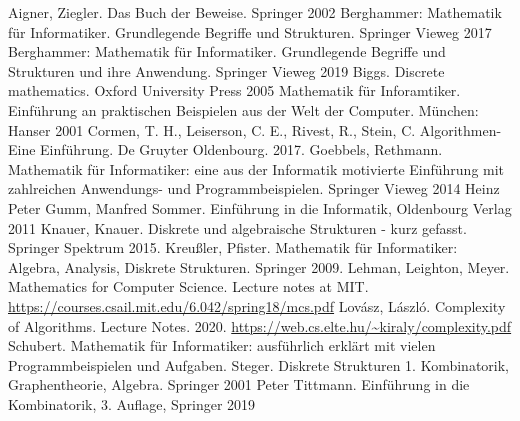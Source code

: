 \begin{thebibliography}{AAAA}
	 Aigner, Ziegler. Das Buch der Beweise. Springer 2002
	 Berghammer: Mathematik für Informatiker. Grundlegende Begriffe und Strukturen. Springer Vieweg 2017
	 Berghammer: Mathematik für Informatiker. Grundlegende Begriffe und Strukturen und ihre Anwendung. Springer Vieweg 2019
	 Biggs. Discrete mathematics. Oxford University Press 2005
	 Mathematik für Inforamtiker. Einführung an praktischen Beispielen aus der Welt der Computer. München: Hanser 2001
	 Cormen, T. H., Leiserson, C. E., Rivest, R., Stein, C.  Algorithmen-Eine Einführung. De Gruyter Oldenbourg. 2017. 
	 Goebbels, Rethmann. Mathematik für Informatiker: eine aus der Informatik motivierte Einführung mit zahlreichen Anwendungs- und Programmbeispielen. Springer Vieweg 2014
	 Heinz Peter Gumm, Manfred Sommer. Einführung in die Informatik, Oldenbourg Verlag 2011
	 Knauer, Knauer. Diskrete und algebraische Strukturen - kurz gefasst. Springer Spektrum 2015. 
	 Kreußler, Pfister. Mathematik für Informatiker: Algebra, Analysis, Diskrete Strukturen. Springer 2009. 
	 Lehman, Leighton, Meyer. Mathematics for Computer Science. Lecture notes at MIT. \url{https://courses.csail.mit.edu/6.042/spring18/mcs.pdf} 
	 Lov\'asz, L\'aszl\'o. Complexity of Algorithms. Lecture Notes. 2020. \url{https://web.cs.elte.hu/~kiraly/complexity.pdf} 
	 Schubert. Mathematik für Informatiker: ausführlich erklärt mit vielen Programmbeispielen und Aufgaben.  
	 Steger. Diskrete Strukturen 1. Kombinatorik, Graphentheorie, Algebra. Springer 2001
	 Peter Tittmann. Einführung in die Kombinatorik, 3. Auflage, Springer 2019
\end{thebibliography} 
